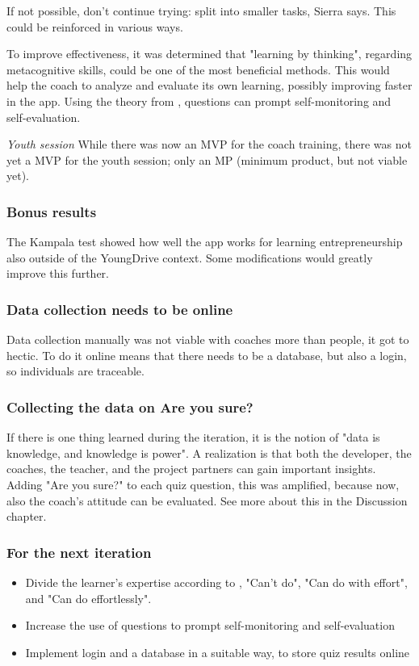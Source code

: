   If not possible, don't continue trying: split into smaller tasks, Sierra says. This could be reinforced in various ways.

  To improve effectiveness, it was determined that "learning by thinking", regarding metacognitive skills, could be one of the most beneficial methods. This would help the coach to analyze and evaluate its own learning, possibly improving faster in the app. Using the theory from \cite{sitzmann}, questions can prompt self-monitoring and self-evaluation.

  \textit{Youth session}
  While there was now an MVP for the coach training, there was not yet a MVP for the youth session; only an MP (minimum product, but not viable yet).

  \subsubsection{Bonus results}
  The Kampala test showed how well the app works for learning entrepreneurship also outside of the YoungDrive context. Some modifications would greatly improve this further.

  \subsubsection{Data collection needs to be online}

  Data collection manually was not viable with coaches more than people, it got to hectic. To do it online means that there needs to be a database, but also a login, so individuals are traceable.

  \subsubsection{Collecting the data on Are you sure?}
  If there is one thing learned during the iteration, it is the notion of "data is knowledge, and knowledge is power". A realization is that both the developer, the coaches, the teacher, and the project partners can gain important insights. Adding "Are you sure?" to each quiz question, this was amplified, because now, also the coach's attitude can be evaluated. See more about this in the Discussion chapter. 

  \subsubsection{For the next iteration}
  \begin{itemize}
  \item Divide the learner's expertise according to \cite{sierra}, "Can't do", "Can do with effort", and "Can do effortlessly".
  \item Increase the use of questions to prompt self-monitoring and self-evaluation
  \item Implement login and a database in a suitable way, to store quiz results online
  \end{itemize}

